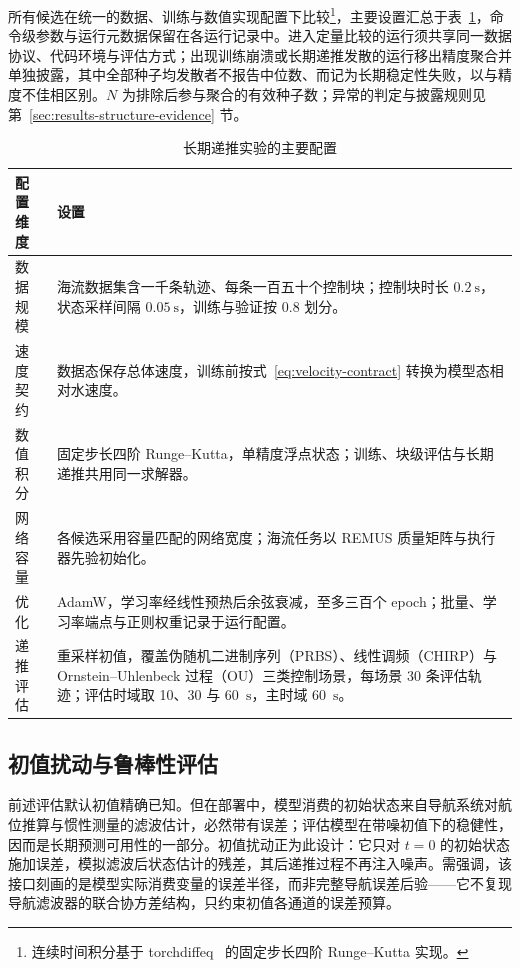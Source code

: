 所有候选在统一的数据、训练与数值实现配置下比较\footnote{连续时间积分基于 torchdiffeq~\citep{chen2018neuralode} 的固定步长四阶 Runge--Kutta 实现。}，主要设置汇总于表~\ref{tab:experimental-config}，命令级参数与运行元数据保留在各运行记录中。进入定量比较的运行须共享同一数据协议、代码环境与评估方式；出现训练崩溃或长期递推发散的运行移出精度聚合并单独披露，其中全部种子均发散者不报告中位数、而记为长期稳定性失败，以与精度不佳相区别。\(N\) 为排除后参与聚合的有效种子数；异常的判定与披露规则见第~\ref{sec:results-structure-evidence} 节。

\begin{table}[htbp]
  \centering
  \caption{长期递推实验的主要配置}
  \label{tab:experimental-config}
  \begin{tabularx}{\textwidth}{>{\raggedright\arraybackslash}p{}>{\raggedright\arraybackslash}X}
    \toprule
    配置维度 & 设置 \\
    \midrule
    数据规模 & 海流数据集含一千条轨迹、每条一百五十个控制块；控制块时长 \(0.2~\mathrm{s}\)，状态采样间隔 \(0.05~\mathrm{s}\)，训练与验证按 \(0.8\) 划分。 \\
    速度契约 & 数据态保存总体速度，训练前按式~\eqref{eq:velocity-contract} 转换为模型态相对水速度。 \\
    数值积分 & 固定步长四阶 Runge--Kutta，单精度浮点状态；训练、块级评估与长期递推共用同一求解器。 \\
    网络容量 & 各候选采用容量匹配的网络宽度；海流任务以 REMUS 质量矩阵与执行器先验初始化。 \\
    优化 & AdamW，学习率经线性预热后余弦衰减，至多三百个 epoch；批量、学习率端点与正则权重记录于运行配置。 \\
    递推评估 & 重采样初值，覆盖伪随机二进制序列（PRBS）、线性调频（CHIRP）与 Ornstein--Uhlenbeck 过程（OU）三类控制场景，每场景 30 条评估轨迹；评估时域取 10、30 与 60~\(\mathrm{s}\)，主时域 60~\(\mathrm{s}\)。 \\
    \bottomrule
  \end{tabularx}
\end{table}

\subsection{初值扰动与鲁棒性评估}
\label{subsec:ic-perturbation}

前述评估默认初值精确已知。但在部署中，模型消费的初始状态来自导航系统对航位推算与惯性测量的滤波估计，必然带有误差；评估模型在带噪初值下的稳健性，因而是长期预测可用性的一部分。初值扰动正为此设计：它只对 \(t=0\) 的初始状态施加误差，模拟滤波后状态估计的残差，其后递推过程不再注入噪声。需强调，该接口刻画的是模型实际消费变量的误差半径，而非完整导航误差后验——它不复现导航滤波器的联合协方差结构，只约束初值各通道的误差预算。

